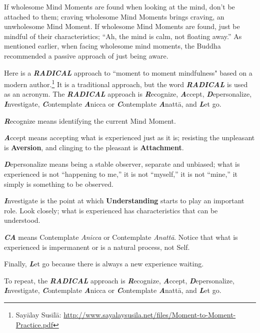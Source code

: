 If wholesome Mind Moments are found when looking at the mind, don’t be attached to them; craving wholesome Mind Moments brings craving, an unwholesome Mind Moment. If wholesome Mind Moments are found, just be mindful of their characteristics; “Ah, the mind is calm, not floating away.” As mentioned earlier, when facing wholesome mind moments, the Buddha recommended a passive approach of just being aware.

Here is a \textbf{\textit{RADICAL}} approach to ``moment to moment mindfulness" based on a modern author.\footnote{Sayālay Susīlā: \url{http://www.sayalaysusila.net/files/Moment-to-Moment-Practice.pdf}} It is a traditional approach, but the word \textbf{\textit{RADICAL}} is used as an acronym. The \textbf{\textit{RADICAL}} approach is \textbf{\textit{R}}ecognize, \textbf{\textit{A}}ccept, \textbf{\textit{D}}epersonalize, \textbf{\textit{I}}nvestigate, \textbf{\textit{C}}ontemplate \textbf{\textit{A}}nicca or \textbf{\textit{C}}ontemplate \textbf{\textit{A}}nattā, and \textbf{\textit{L}}et go.

\pagebreak

\textbf{\textit{R}}ecognize means identifying the current Mind Moment.

\textbf{\textit{A}}ccept means accepting what is experienced just as it is; resisting the unpleasant is \textbf{Aversion}, and clinging to the pleasant is \textbf{Attachment}. 

\textbf{\textit{D}}epersonalize means being a stable observer, separate and unbiased; what is experienced is not “happening to me,” it is not “myself,” it is not “mine,” it simply is something to be observed. 

\textbf{\textit{I}}nvestigate is the point at which \textbf{Understanding} starts to play an important role. Look closely; what is experienced has characteristics that can be understood. 

\textbf{\textit{CA}} means Contemplate \textit{Anicca} or Contemplate \textit{Anattā}. Notice that what is experienced is impermanent or is a natural process, not Self. 

Finally, \textbf{\textit{L}}et go because there is always a new experience waiting.

To repeat, the \textbf{\textit{RADICAL}} approach is \textbf{\textit{R}}ecognize, \textbf{\textit{A}}ccept, \textbf{\textit{D}}epersonalize, \textbf{\textit{I}}nvestigate, \textbf{\textit{C}}ontemplate \textbf{\textit{A}}nicca or \textbf{\textit{C}}ontemplate \textbf{\textit{A}}nattā, and \textbf{\textit{L}}et go.


